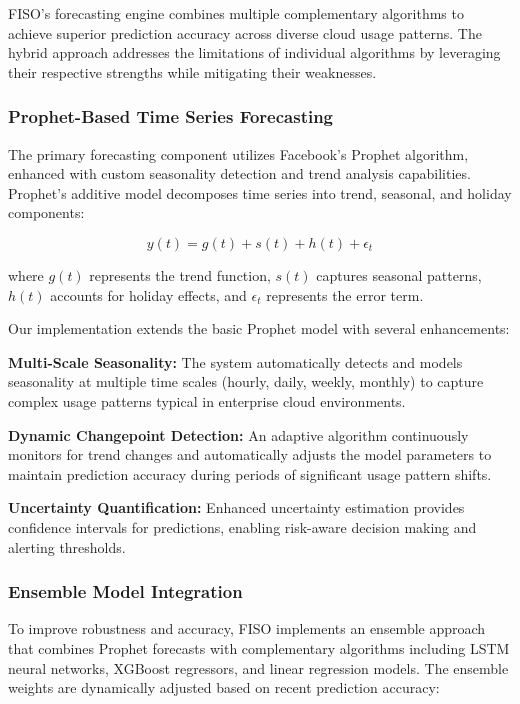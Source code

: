 \documentclass[conference]{IEEEtran}
\begin{document}
FISO's forecasting engine combines multiple complementary algorithms to achieve superior prediction accuracy across diverse cloud usage patterns. The hybrid approach addresses the limitations of individual algorithms by leveraging their respective strengths while mitigating their weaknesses.

\subsubsection{Prophet-Based Time Series Forecasting}

The primary forecasting component utilizes Facebook's Prophet algorithm, enhanced with custom seasonality detection and trend analysis capabilities. Prophet's additive model decomposes time series into trend, seasonal, and holiday components:

\begin{equation}
y(t) = g(t) + s(t) + h(t) + \epsilon_t
\end{equation}

where $g(t)$ represents the trend function, $s(t)$ captures seasonal patterns, $h(t)$ accounts for holiday effects, and $\epsilon_t$ represents the error term.

Our implementation extends the basic Prophet model with several enhancements:

\textbf{Multi-Scale Seasonality:} The system automatically detects and models seasonality at multiple time scales (hourly, daily, weekly, monthly) to capture complex usage patterns typical in enterprise cloud environments.

\textbf{Dynamic Changepoint Detection:} An adaptive algorithm continuously monitors for trend changes and automatically adjusts the model parameters to maintain prediction accuracy during periods of significant usage pattern shifts.

\textbf{Uncertainty Quantification:} Enhanced uncertainty estimation provides confidence intervals for predictions, enabling risk-aware decision making and alerting thresholds.

\subsubsection{Ensemble Model Integration}

To improve robustness and accuracy, FISO implements an ensemble approach that combines Prophet forecasts with complementary algorithms including LSTM neural networks, XGBoost regressors, and linear regression models. The ensemble weights are dynamically adjusted based on recent prediction accuracy:
\end{document}
